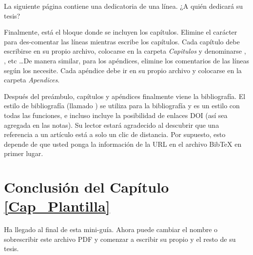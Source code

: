 La siguiente página contiene una dedicatoria de una línea. ¿A quién dedicará su tesis?

Finalmente, está el bloque donde se incluyen los capítulos. Elimine el  carácter  \code{\%} para des-comentar las líneas mientras escribe los capítulos. Cada capítulo debe escribirse en su propio archivo, colocarse en la carpeta \emph{Capitulos} y denominarse , , etc \ldots De manera similar, para los apéndices, elimine los comentarios de las líneas según los necesite. Cada apéndice debe ir en su propio archivo y colocarse en la carpeta \emph{Apendices}.

Después del preámbulo, capítulos y apéndices finalmente viene la bibliografía. El estilo de bibliografía (llamado ) se utiliza para la bibliografía y es un estilo con todas las funciones, e  incluso incluye la posibilidad de  enlaces DOI (así sea agregada en las notas). Su lector estará agradecido al descubrir que una referencia a un artículo está a solo un clic de distancia. Por supuesto, esto depende de que usted ponga la información de la URL en el archivo BibTeX en primer lugar.





\section{Conclusión del Capítulo \ref{Cap_Plantilla} }

Ha llegado al final de esta mini-guía. Ahora puede cambiar el nombre o sobrescribir este archivo PDF y comenzar a escribir su propio  y el resto de su tesis.






